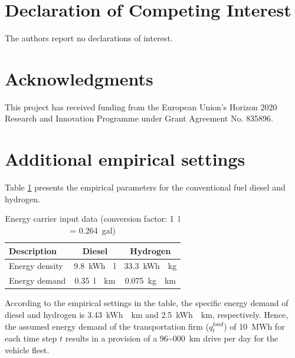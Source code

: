 \documentclass[review]{elsarticle}
\begin{document}
\section*{Declaration of Competing Interest}
The authors report no declarations of interest.
\section*{Acknowledgments}
This project has received funding from the European Union's Horizon 2020 Research and Innovation Programme under Grant Agreement No. 835896.


\appendix
\setcounter{table}{0}
\setcounter{figure}{0}

\section{Additional empirical settings}\label{app:a}

Table \ref{tab:appendix} presents the empirical parameters for  the conventional fuel diesel and hydrogen. 

\begin{table}[h]
	\setlength{\extrarowheight}{.5em}
	\centering
	\begin{tabular}{lcc}
		\toprule
		Description & Diesel & Hydrogen\\
		\hline 
		Energy density & \SI{9.8}{kWh \per l} & \SI{33.3}{kWh \per kg}\\
		Energy demand & \SI{0.35}{l \per km} & \SI{0.075}{kg \per km}\\
		\bottomrule
	\end{tabular}
	\caption{Energy carrier input data (conversion factor: \SI{1}{\litre} = \SI{0.264}{gal})}
	\label{tab:appendix}
\end{table}

According to the empirical settings in the table, the specific energy demand of diesel and hydrogen is \SI{3.43}{kWh \per km} and \SI{2.5}{kWh \per km}, respectively. Hence, the assumed energy demand of the transportation firm ($q_{t}^{load}$) of \SI{10}{MWh} for each time step $t$ results in a provision of a \SI{96~000}{km} drive per day for the vehicle fleet. 
\end{document}
